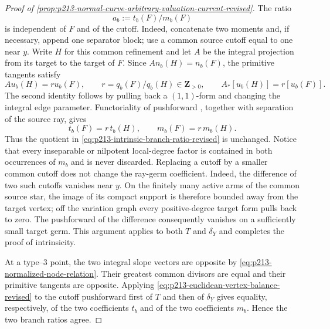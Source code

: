 \begin{proof}[Proof of
\cref{prop:p213-normal-curve-arbitrary-valuation-current-revised}]
The ratio
\begin{equation}
                              a_b:=t_b(F)/m_b(F)
\label{eq:p213-intrinsic-branch-ratio-revised}
\end{equation}
is independent of $F$ and of the cutoff.  Indeed, concatenate two moments
and, if necessary, append one separator block; use a common source cutoff
equal to one near $y$.  Write $H$ for this common refinement and let $A$
be the integral projection from its target to the target of $F$.  Since
$A n_b(H)=n_b(F)$, the primitive tangents satisfy
\begin{equation}
       A u_b(H)=r u_b(F),\qquad
       r=q_b(F)/q_b(H)\in\mathbf Z_{>0},\qquad
       A_*[u_b(H)]=r[u_b(F)].
\label{eq:p213-refinement-expansion-revised}
\end{equation}
The second identity follows by pulling back a $(1,1)$-form and changing
the integral edge parameter.  Functoriality of pushforward
\cite[\S7.1.11]{CLD25}, together with separation of the source ray, gives
\begin{equation}
                 t_b(F)=r\,t_b(H),\qquad
                 m_b(F)=r\,m_b(H).
\label{eq:p213-refinement-both-currents-revised}
\end{equation}
Thus the quotient in
\eqref{eq:p213-intrinsic-branch-ratio-revised} is unchanged.  Notice that
every inseparable or nilpotent local-degree factor is contained in both
occurrences of $m_b$ and is never discarded.
Replacing a cutoff by a smaller common cutoff does not change the ray-germ
coefficient.  Indeed, the difference of two such cutoffs vanishes near
$y$.  On the finitely many active arms of the common source star, the
image of its compact support is therefore bounded away from the target
vertex; off the variation graph every positive-degree target form pulls
back to zero.  The pushforward of the difference consequently vanishes on
a sufficiently small target germ.  This argument applies to both $T$ and
$\delta_Y$ and completes the proof of intrinsicity.

At a type--$3$ point, the two integral slope vectors are opposite by
\eqref{eq:p213-normalized-node-relation}.  Their greatest common divisors
are equal and their primitive tangents are opposite.  Applying
\eqref{eq:p213-euclidean-vertex-balance-revised} to the cutoff pushforward
first of $T$ and then of $\delta_Y$ gives equality, respectively, of the
two coefficients $t_b$ and of the two coefficients $m_b$.  Hence the two
branch ratios agree.


\end{proof}

